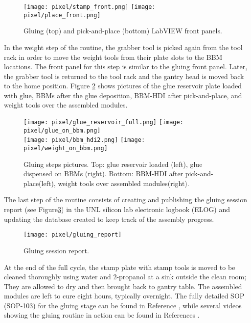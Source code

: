 \begin{figure}[h]
\centering
  \texttt{[image: pixel/stamp\_front.png]}
  \texttt{[image: pixel/place\_front.png]}
 \caption[Gluing and pick-and-place LabVIEW front panels]{Gluing (top) and pick-and-place (bottom) LabVIEW front panels.}\label{fig:stamp_place_front}
\end{figure}

In the weight step of the routine, the grabber tool is picked again from the tool rack in order to move the weight tools from their plate slots to the BBM locations. The front panel for this step is similar to the gluing front panel. Later, the grabber tool is returned to the tool rack and the gantry head is moved back to the home position. Figure \ref{fig:gluing_steps} shows pictures of the glue reservoir plate loaded with glue, BBMs after the glue deposition, BBM-HDI after pick-and-place, and weight tools over the assembled modules. 

\begin{figure}[h]
\centering
  \texttt{[image: pixel/glue\_reservoir\_full.png]}
  \texttt{[image: pixel/glue\_on\_bbm.png]}\\
  \texttt{[image: pixel/bbm\_hdi2.png]}
  \texttt{[image: pixel/weight\_on\_bbm.png]}
  \caption[Gluing steps pictures.]{Gluing steps pictures. Top: glue reservoir loaded (left), glue dispensed on BBMs (right). Bottom: BBM-HDI after pick-and-place(left), weight tools over assembled modules(right).}\label{fig:gluing_steps}
\end{figure}

The last step of the routine consists of creating and publishing the gluing session report (see Figure\ref{fig:gluing_report}) in the UNL silicon lab electronic logbook (ELOG) and updating the database created to keep track of the assembly progress.  

\begin{figure}[h]
\centering
  \texttt{[image: pixel/gluing\_report]}
 \caption[Gluing session report.]{Gluing session report.}\label{fig:gluing_report}
\end{figure}

At the end of the full cycle, the stamp plate with stamp tools is moved to be cleaned thoroughly using water and 2-propanol at a sink outside the clean room; They are allowed to dry and then brought back to gantry table. The assembled modules are left to cure eight hours, typically overnight. The fully detailed SOP (SOP-103) for the gluing stage can be found in Reference \cite{sop_103}, while several videos showing the gluing routine in action can be found in References \cite{gluing_frank, jmonroy_channel}. 

